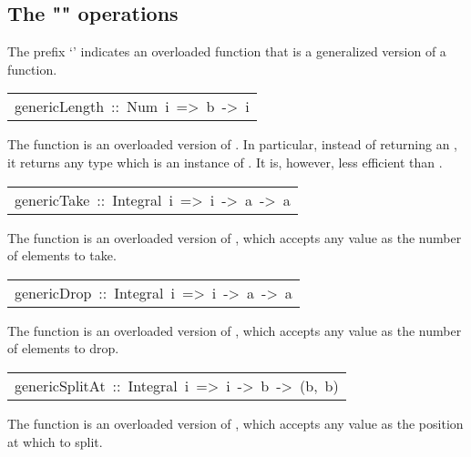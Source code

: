 \subsection{The "" operations
}
The prefix `' indicates an overloaded function that
 is a generalized version of a  function.
\par

\begin{haddockdesc}
\item[\begin{tabular}{@{}l}
genericLength\ ::\ Num\ i\ =>\ {\char 91}b{\char 93}\ ->\ i
\end{tabular}]\haddockbegindoc
The  function is an overloaded version of .  In
 particular, instead of returning an , it returns any type which is
 an instance of .  It is, however, less efficient than .
\par

\end{haddockdesc}
\begin{haddockdesc}
\item[\begin{tabular}{@{}l}
genericTake\ ::\ Integral\ i\ =>\ i\ ->\ {\char 91}a{\char 93}\ ->\ {\char 91}a{\char 93}
\end{tabular}]\haddockbegindoc
The  function is an overloaded version of , which
 accepts any  value as the number of elements to take.
\par

\end{haddockdesc}
\begin{haddockdesc}
\item[\begin{tabular}{@{}l}
genericDrop\ ::\ Integral\ i\ =>\ i\ ->\ {\char 91}a{\char 93}\ ->\ {\char 91}a{\char 93}
\end{tabular}]\haddockbegindoc
The  function is an overloaded version of , which
 accepts any  value as the number of elements to drop.
\par

\end{haddockdesc}
\begin{haddockdesc}
\item[\begin{tabular}{@{}l}
genericSplitAt\ ::\ Integral\ i\ =>\ i\ ->\ {\char 91}b{\char 93}\ ->\ ({\char 91}b{\char 93},\ {\char 91}b{\char 93})
\end{tabular}]\haddockbegindoc
The  function is an overloaded version of , which
 accepts any  value as the position at which to split.
\par

\end{haddockdesc}
